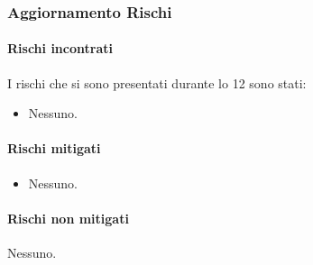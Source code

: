 \subsubsection{Aggiornamento Rischi}
\label{sec:aggiornamento_rischi_sprint12}

\paragraph{Rischi incontrati}
\label{par:rischi_incontrati_sprint12}
I rischi che si sono presentati durante lo  12 sono stati:
\begin{itemize}
    \item Nessuno.
\end{itemize}

\paragraph{Rischi mitigati}
\label{par:rischi_mitigati_sprint12}
\begin{itemize}
    \item Nessuno.
\end{itemize}

\paragraph{Rischi non mitigati}
\label{par:rischi_non_mitigati_sprint12}
Nessuno.
